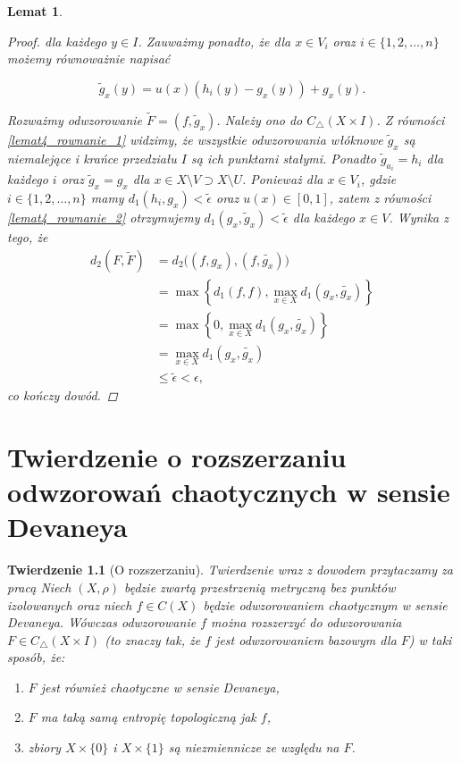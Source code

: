 \documentclass[licencjacka]{pwr_wmat_praca_dyplomowa}
\theoremstyle{plain}
\newtheorem{theorem}{Twierdzenie}
\numberwithin{theorem}{chapter}
\newtheorem{lemma}[theorem]{Lemat}
\theoremstyle{definition}
\numberwithin{theorem}{chapter}
\begin{document}
\begin{lemma}
\begin{proof}
dla każdego $y \in I$. Zauważmy ponadto, że dla $x \in V_i$ oraz $i \in \{1,2,\ldots,n\}$ możemy równoważnie napisać

\begin{equation} \label{lemat4_rownanie_2}
\widetilde{g}_x(y) = u(x)(h_i(y) - g_x(y)) + g_x(y).
\end{equation}

Rozważmy odwzorowanie $\widetilde{F} = (f, \widetilde{g}_x)$. Należy ono do $C_\triangle(X \times I)$. Z równości \ref{lemat4_rownanie_1} widzimy, że wszystkie odwzorowania włóknowe $\widetilde{g}_x$ są niemalejące i krańce przedziału $I$ są ich punktami stałymi. Ponadto $\widetilde{g}_{a_i} = h_i$ dla każdego $i$ oraz $\widetilde{g}_x = g_x$ dla $x \in X \setminus V \supset X \setminus U$. Ponieważ dla $x \in V_i$, gdzie $i \in \{1,2,\ldots,n\}$ mamy $d_1(h_i, g_x) < \widetilde{\epsilon}$ oraz $u(x) \in [0,1]$, zatem z równości \ref{lemat4_rownanie_2} otrzymujemy $d_1(g_x, \widetilde{g}_x) < \widetilde{\epsilon}$ dla każdego $x \in V$.
Wynika z tego, że 
\begin{align*}
d_2(F, \widetilde{F}) & = d_2\big((f, g_x), (f, \widetilde{g_x})\big) \\
& = \max\left\{d_1(f, f), \max_{x \in X}d_1(g_x, \widetilde{g_x})\right\} \\
& = \max\left\{0, \max_{x \in X}d_1(g_x, \widetilde{g_x})\right\} \\
& = \max_{x \in X}d_1(g_x, \widetilde{g_x}) \\
& \leq \widetilde{\epsilon} < \epsilon,
\end{align*}
co kończy dowód.
\end{proof}

\end{lemma}



\chapter{Twierdzenie o rozszerzaniu odwzorowań chaotycznych w sensie Devaneya}
\begin{theorem}[O rozszerzaniu]\label{twierdzenie_glowne}
Twierdzenie wraz z dowodem przytaczamy za pracą \cite{balibrea2003topological}
Niech $(X, \rho)$ będzie zwartą przestrzenią metryczną bez punktów izolowanych oraz niech $f \in C(X)$ będzie odwzorowaniem chaotycznym w sensie Devaneya. Wówczas odwzorowanie $f$ można rozszerzyć do odwzorowania $F \in C_{\triangle}(X \times I)$ (to znaczy tak, że $f$ jest odwzorowaniem bazowym dla $F$) w taki sposób, że:
\begin{enumerate}[label=(\roman*)]
\item\label{twierdzenie_glowne_a} $F$ jest również chaotyczne w sensie Devaneya, 
\item\label{twierdzenie_glowne_b} $F$ ma taką samą entropię topologiczną jak $f$, 
\item\label{twierdzenie_glowne_c} zbiory $X \times \{0\}$ i $X \times \{1\}$ są niezmiennicze ze względu na $F$.
\end{enumerate}
\end{theorem}
\end{document}
